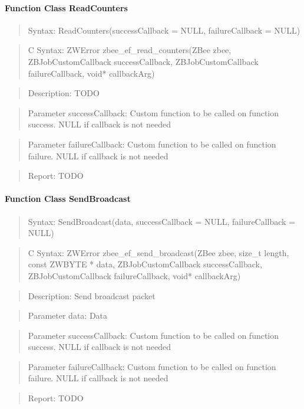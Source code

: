 \paragraph{Function Class ReadCounters}
\begin{quote}Syntax: ReadCounters(successCallback = NULL, failureCallback = NULL)\end{quote}
\begin{quote}C Syntax: ZWError zbee\_ef\_read\_counters(ZBee zbee, ZBJobCustomCallback successCallback, ZBJobCustomCallback failureCallback, void* callbackArg)\end{quote}
\begin{quote}Description: TODO\end{quote}
\begin{quote}Parameter successCallback: Custom function to be called on function success. NULL if callback is not needed\end{quote}
\begin{quote}Parameter failureCallback: Custom function to be called on function failure. NULL if callback is not needed\end{quote}
\begin{quote}Report: TODO\end{quote}

\paragraph{Function Class SendBroadcast}
\begin{quote}Syntax: SendBroadcast(data, successCallback = NULL, failureCallback = NULL)\end{quote}
\begin{quote}C Syntax: ZWError zbee\_ef\_send\_broadcast(ZBee zbee, size\_t length, const ZWBYTE * data, ZBJobCustomCallback successCallback, ZBJobCustomCallback failureCallback, void* callbackArg)\end{quote}
\begin{quote}Description: Send broadcast packet\end{quote}
\begin{quote}Parameter data: Data\end{quote}
\begin{quote}Parameter successCallback: Custom function to be called on function success. NULL if callback is not needed\end{quote}
\begin{quote}Parameter failureCallback: Custom function to be called on function failure. NULL if callback is not needed\end{quote}
\begin{quote}Report: TODO\end{quote}

